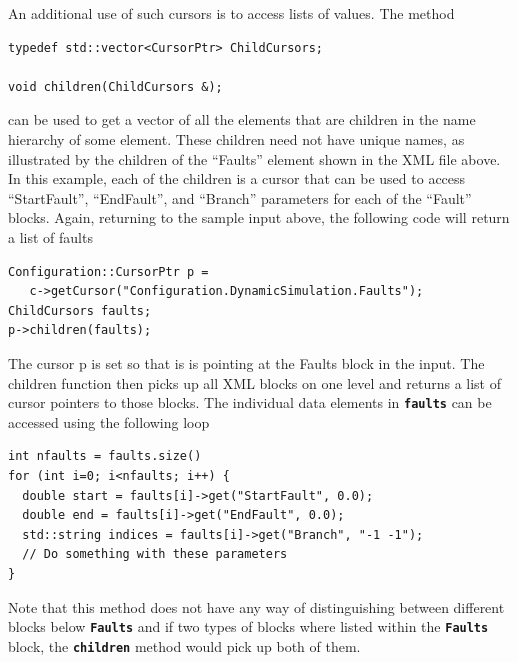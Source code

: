 An additional use of such cursors is to access lists of values. The method

{
\color{red}
\begin{Verbatim}[fontseries=b]
typedef std::vector<CursorPtr> ChildCursors;

void children(ChildCursors &);
\end{Verbatim}
}

can be used to get a vector of all the elements that are children in the name
hierarchy of some element. These children need not have unique names, as
illustrated by the children of the ``Faults'' element shown in the XML file above. In this example, each of the children is a cursor that can be used to access ``StartFault'', ``EndFault'', and ``Branch'' parameters for each of the ``Fault'' blocks. Again, returning to the sample input above, the following code will return a list of faults

{
\color{red}
\begin{Verbatim}[fontseries=b]
Configuration::CursorPtr p = 
   c->getCursor("Configuration.DynamicSimulation.Faults");
ChildCursors faults;
p->children(faults);
\end{Verbatim}
}

The cursor p is set so that is is pointing at the Faults block in the input. The children function then picks up all XML blocks on one level and returns a list of cursor pointers to those blocks. The individual data elements in \texttt{\textbf{faults}} can be accessed using the following loop

{
\color{red}
\begin{Verbatim}[fontseries=b]
int nfaults = faults.size()
for (int i=0; i<nfaults; i++) {
  double start = faults[i]->get("StartFault", 0.0);
  double end = faults[i]->get("EndFault", 0.0);
  std::string indices = faults[i]->get("Branch", "-1 -1");
  // Do something with these parameters
}
\end{Verbatim}
}

Note that this method does not have any way of distinguishing between different blocks below \texttt{\textbf{Faults}} and if two types of blocks where listed within the \texttt{\textbf{Faults}} block, the \texttt{\textbf{children}} method would pick up both of them.
\newline
\hyperlink{topDoc}{\color{blue}{Top}}
